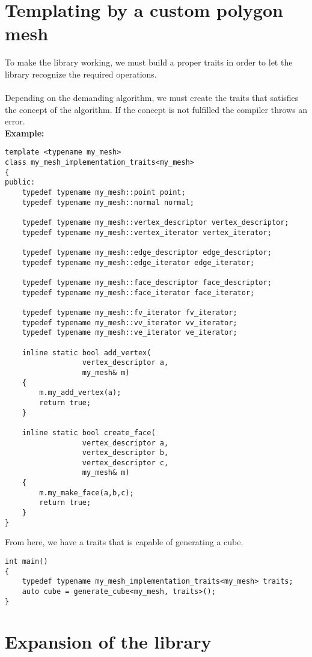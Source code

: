 \begin{appendices}
\chapter{Templating by a custom polygon mesh}

To make the library working, we must build a proper traits in order to let the library recognize
the required operations.\\
\\
Depending on the demanding algorithm, we must create the traits that satisfies the concept
of the algorithm. If the concept is not fulfilled the compiler throws an error.\\

\textbf{Example:}

\begin{lstlisting}
template <typename my_mesh>
class my_mesh_implementation_traits<my_mesh>
{
public:
	typedef typename my_mesh::point point;
	typedef typename my_mesh::normal normal;

	typedef typename my_mesh::vertex_descriptor vertex_descriptor;
	typedef typename my_mesh::vertex_iterator vertex_iterator;

	typedef typename my_mesh::edge_descriptor edge_descriptor;
	typedef typename my_mesh::edge_iterator edge_iterator;

	typedef typename my_mesh::face_descriptor face_descriptor;
	typedef typename my_mesh::face_iterator face_iterator;

	typedef typename my_mesh::fv_iterator fv_iterator;
	typedef typename my_mesh::vv_iterator vv_iterator;
	typedef typename my_mesh::ve_iterator ve_iterator;
	
	inline static bool add_vertex(
				  vertex_descriptor a,
		  	  	  my_mesh& m)
	{
		m.my_add_vertex(a);
		return true;
	}		
	
	inline static bool create_face(
				  vertex_descriptor a,
				  vertex_descriptor b,
				  vertex_descriptor c,
		  	  	  my_mesh& m)
	{
		m.my_make_face(a,b,c);
		return true;
	}
}
\end{lstlisting}

From here, we have a traits that is capable of generating a cube.

\begin{lstlisting}
int main()
{
	typedef typename my_mesh_implementation_traits<my_mesh> traits;
	auto cube = generate_cube<my_mesh, traits>();
}
\end{lstlisting}

\chapter{Expansion of the library}


\end{appendices}
